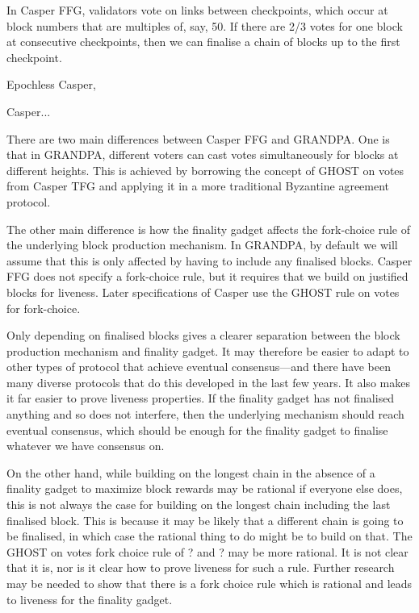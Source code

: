 \documentclass{article}
\begin{document}
In Casper FFG\cite{CasperFFG}, validators vote on links between checkpoints, which occur at block numbers that are multiples of, say, 50. If there are 2/3 votes for one block at consecutive checkpoints, then we can finalise a chain of blocks up to the first checkpoint.

Epochless Casper, 

Casper...

There are two main differences between Casper FFG and GRANDPA. One is that in GRANDPA, different voters can cast votes simultaneously for blocks at different heights. This is achieved by borrowing the concept of GHOST on votes from Casper TFG and applying it in a more traditional Byzantine agreement protocol.

The other main difference is how the finality gadget affects the fork-choice rule of the underlying block production mechanism. In GRANDPA, by default we will assume that this is only affected by having to include any finalised blocks. 
Casper FFG \cite{CasperFFG} does not specify a fork-choice rule, but it requires that we build on justified blocks for liveness. Later specifications of Casper use the GHOST rule on votes for fork-choice.

Only depending on finalised blocks gives a clearer separation between the block production mechanism and finality gadget. It may therefore be easier to adapt to other types of protocol that achieve eventual consensus—and there have been many diverse protocols that do this developed in the last few years.
It also makes it far easier to prove liveness properties.
If the finality gadget has not finalised anything and so does not interfere, then the underlying mechanism should reach eventual consensus, which should be enough for the finality gadget to finalise whatever we have consensus on.

On the other hand, while building on the longest chain in the absence of a finality gadget to maximize block rewards may be rational if everyone else does, this is not always the case for building on the longest chain including the last finalised block.
This is because it may be likely that a different chain is going to be finalised, in which case the rational thing to do might be to build on that. The GHOST on votes fork choice rule of ? and ? may be more rational.
It is not clear that it is, nor is it clear how to prove liveness for such a rule. Further research may be needed to show that there is a fork choice rule which is rational and leads to liveness for the finality gadget. 
\end{document}
